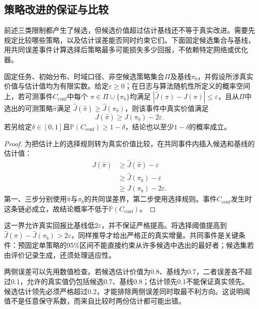 \subsection{策略改进的保证与比较}
\label{sec:rl-information-improvement}

前述三类限制都产生了候选，但候选价值超过估计基线还不等于真实改进。需要先规定比较哪些策略，以及估计误差能否同时约束它们。下面固定候选集合与基线，用共同误差事件计算选择后策略最多可能损失多少回报，不依赖特定网络或优化器。

\begin{theorem}[共同误差事件上的基线性能控制]
  \label{thm:rl-information-improvement}
  固定任务、初始分布、时域口径、非空候选策略集合$\Pi$及基线$\pi_b$，并假设所涉真实价值与估计值均为有限实数。给定$\varepsilon\geq0$；在日志与算法随机性所定义的概率空间上，若可测事件$C_{\mathrm{conf}}$中每个
  $\pi\in\Pi\cup\{\pi_b\}$均满足
  $|\widehat J(\pi)-J(\pi)|\leq\varepsilon$，且从$\Pi$中选出的可测策略$\widehat\pi$满足
  $\widehat J(\widehat\pi)\geq\widehat J(\pi_b)$，则该事件中真实价值满足
  \[
    J(\widehat\pi)\geq J(\pi_b)-2\varepsilon.
  \]
  若另给定$\delta\in[0,1]$且$\mathbb P(C_{\mathrm{conf}})\geq1-\delta$，结论也以至少$1-\delta$的概率成立。
\end{theorem}

\begin{proof}
  为把估计上的选择规则转为真实价值比较，在共同事件内插入候选和基线的估计值：
  \[
  \begin{aligned}
    J(\widehat\pi)
    &\geq\widehat J(\widehat\pi)-\varepsilon\\
    &\geq\widehat J(\pi_b)-\varepsilon\\
    &\geq J(\pi_b)-2\varepsilon.
  \end{aligned}
  \]
  第一、三步分别使用$\widehat\pi$与$\pi_b$的共同误差界，第二步使用选择规则。事件$C_{\mathrm{conf}}$发生时这条链必成立，故结论概率不低于$\mathbb P(C_{\mathrm{conf}})$。
\end{proof}

这一界允许真实回报比基线低$2\varepsilon$，并不保证严格提高。将选择阈值提高到
$\widehat J(\widehat\pi)-\widehat J(\pi_b)>2\varepsilon$，同样推导才给出严格正的真实增量。共同事件是关键条件：预固定单策略的95\%区间不能直接约束从许多候选中选出的最好者；候选集若由评价记录生成，还须处理适应性。

两侧误差可以先用数值检查。若候选估计价值为0.8、基线为0.7，二者误差各不超过0.1，允许的真实值仍包括候选0.7、基线0.8；估计领先0.1不能保证真实领先。候选估计领先必须严格超过0.2，才能排除两侧误差同时取最不利方向。这说明阈值不是任意保守系数，而来自比较时两份估计都可能出错。

